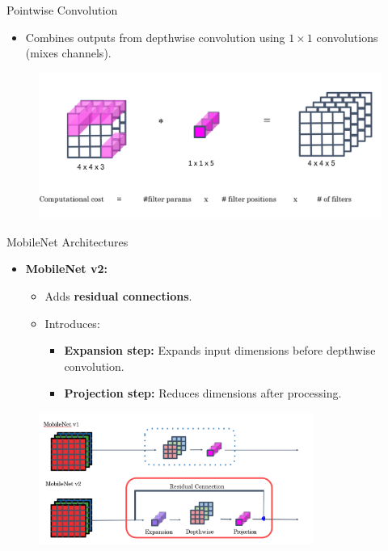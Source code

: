 \begin{frame}{Pointwise Convolution}
    \begin{itemize}
        \item Combines outputs from depthwise convolution using \(1 \times 1\) convolutions (mixes channels).
    \end{itemize}
    \begin{figure}
        \centering
        \includegraphics[width=0.8\linewidth]{images/cnn/PointWise_conv.png}
    \end{figure}
\end{frame}

\begin{frame}{MobileNet Architectures}
    \begin{itemize}
        \item \textbf{MobileNet v2:}
        \begin{itemize}
            \item Adds \textbf{residual connections}.
            \item Introduces:
            \begin{itemize}
                \item \textbf{Expansion step:} Expands input dimensions before depthwise convolution.
                \item \textbf{Projection step:} Reduces dimensions after processing.
            \end{itemize}
        \end{itemize}
    \end{itemize}
    \begin{figure}
        \centering
        \includegraphics[width=0.8\textwidth,height=.7\textheight,keepaspectratio]{images/cnn/MobileNet_1_and_2.png} 
    \end{figure}
\end{frame}